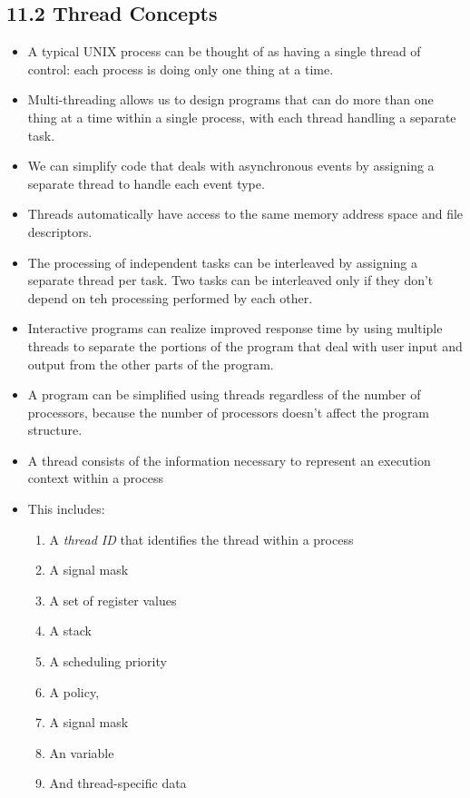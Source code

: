\documentclass[]{article}
\begin{document}
\subsection*{11.2 Thread Concepts}
\begin{itemize}
\item A typical UNIX process can be thought of as having a single thread of
control: each process is doing only one thing at a time.
\item Multi-threading allows us to design programs that can do more than one
thing at a time within a single process, with each thread handling a separate
task.
\item We can simplify code that deals with asynchronous events by assigning a
separate thread to handle each event type.
\item Threads automatically have access to the same memory address space and
file descriptors.
\item The processing of independent tasks can be interleaved by assigning a
separate thread per task. Two tasks can be interleaved only if they don't depend
on teh processing performed by each other.
\item Interactive programs can realize improved response time by using multiple
threads to separate the portions of the program that deal with user input and
output from the other parts of the program.
\item A program can be simplified using threads regardless of the number of
processors, because the number of processors doesn't affect the program
structure.
\item A thread consists of the information necessary to represent an execution
context within a process
\item This includes:
\begin{enumerate}
\item A \emph{thread ID} that identifies the thread within a process
\item A signal mask
\item A set of register values
\item A stack
\item A scheduling priority
\item A policy,
\item A signal mask
\item An  variable
\item And thread-specific data
\end{enumerate}
\end{itemize}
\end{document}
